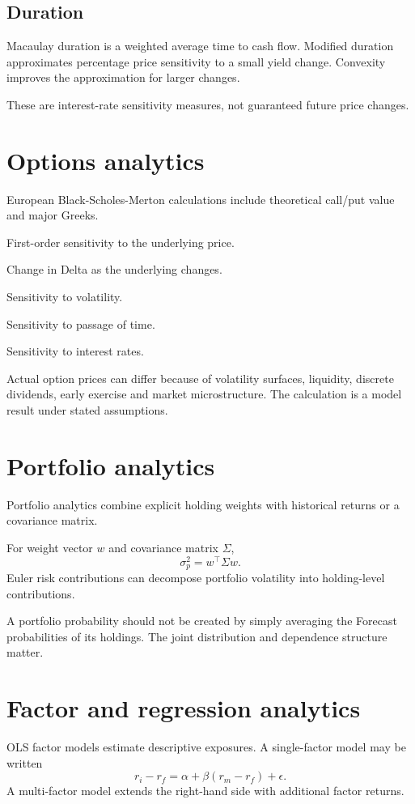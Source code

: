 \documentclass[11pt]{article}
\begin{document}
\subsection{Duration}
Macaulay duration is a weighted average time to cash flow. Modified duration approximates percentage price sensitivity to a small yield change. Convexity improves the approximation for larger changes.

These are interest-rate sensitivity measures, not guaranteed future price changes.

\section{Options analytics}
European Black-Scholes-Merton calculations include theoretical call/put value and major Greeks.

\begin{description}[style=nextline]
\item[Delta] First-order sensitivity to the underlying price.
\item[Gamma] Change in Delta as the underlying changes.
\item[Vega] Sensitivity to volatility.
\item[Theta] Sensitivity to passage of time.
\item[Rho] Sensitivity to interest rates.
\end{description}

Actual option prices can differ because of volatility surfaces, liquidity, discrete dividends, early exercise and market microstructure. The calculation is a model result under stated assumptions.

\section{Portfolio analytics}
Portfolio analytics combine explicit holding weights with historical returns or a covariance matrix.

For weight vector $w$ and covariance matrix $\Sigma$,
\begin{equation}
\sigma_p^2=w^\top\Sigma w.
\end{equation}
Euler risk contributions can decompose portfolio volatility into holding-level contributions.

A portfolio probability should not be created by simply averaging the Forecast probabilities of its holdings. The joint distribution and dependence structure matter.

\section{Factor and regression analytics}
OLS factor models estimate descriptive exposures. A single-factor model may be written
\begin{equation}
r_i-r_f=\alpha+\beta(r_m-r_f)+\epsilon.
\end{equation}
A multi-factor model extends the right-hand side with additional factor returns.
\end{document}
